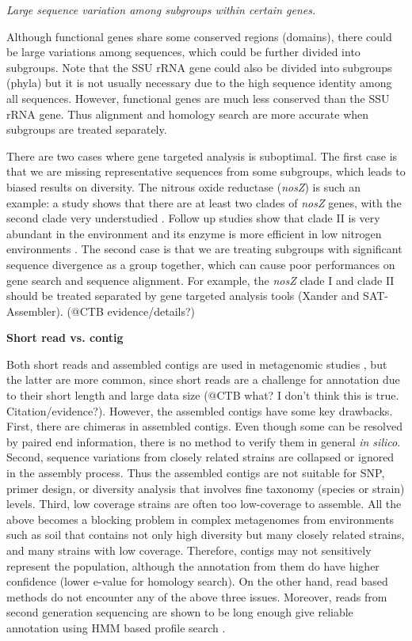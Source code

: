 \documentclass[]{msu-thesis}
\begin{document}
\textit{Large sequence variation among subgroups within certain genes. }

Although functional genes share some conserved regions (domains),
there could be large variations among sequences, which could be
further divided into subgroups. Note that the SSU rRNA gene could also be
divided into subgroups (phyla) but it is not usually necessary due to the high
sequence identity among all sequences. However, functional genes are much less
conserved than the SSU rRNA gene. Thus alignment and homology search are
more accurate when subgroups are treated separately.

There are two cases where gene targeted analysis is suboptimal.
The first case is that
we are missing representative sequences from some subgroups, which
leads to biased results on diversity. The nitrous oxide reductase
(\textit{nosZ}) is such an example: a study shows that there are
at least two clades of \textit{nosZ} genes, with the second clade
very understudied
\cite{sanford_unexpected_2012}. Follow up studies show that clade II
is very abundant in the environment and its enzyme is more efficient in
low nitrogen environments \cite{yoon_nitrous_2016}.  The second case is
that we are treating subgroups with significant sequence divergence as
a group together, which can cause poor performances on gene search and
sequence alignment. For example, the \textit{nosZ} clade I and clade II
should be treated separated by gene targeted analysis tools (Xander
and SAT-Assembler). (@CTB evidence/details?)

\textbf{Short read vs. contig }

Both short reads and assembled contigs are used in metagenomic studies
\cite{fierer_cross-biome_2012,qin_human_2010,howe_tackling_2014}, but
the latter are more common, since short reads are a challenge for
annotation due to their short length and large data size (@CTB what? I
don't think this is true. Citation/evidence?). However, the assembled
contigs have some key drawbacks. First, there are chimeras in
assembled contigs. Even though some can be resolved by paired end
information, there is no method to verify them in general \textit{in
  silico}. Second, sequence variations from closely related strains
are collapsed or ignored in the assembly process. Thus the assembled
contigs are not suitable for SNP, primer design, or diversity analysis
that involves fine taxonomy (species or strain) levels. Third, low
coverage strains are often too low-coverage to assemble. All the above becomes
a blocking problem in complex metagenomes from environments such as soil
that contains not only high diversity but many closely related strains, and many
strains with low coverage. Therefore, contigs may not sensitively represent
the population,
although the annotation from them
do have higher confidence (lower e-value for homology search). On the
other hand, read based methods do not encounter any of the above three
issues. Moreover, reads from second generation sequencing are shown
to be long enough give reliable annotation using HMM based profile
search \cite{zhang_metadomain:_2012}.
\end{document}
